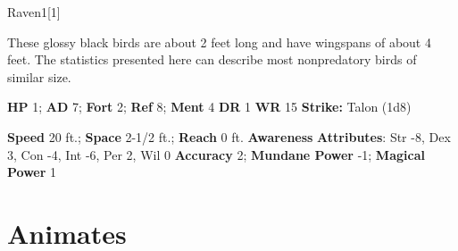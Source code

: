   
  \begin{monsection}{Raven}{1}[1]
    \vspace{-1em}\vspace{-1em}
    \vspace{0em}

    
      These glossy black birds are about 2 feet long and have wingspans of about 4 feet.
      The statistics presented here can describe most nonpredatory birds of similar size.
    

    \begin{spellcontent}
      \begin{spelltargetinginfo}
        \pari \textbf{HP} 1;
          \textbf{AD} 7;
          \textbf{Fort} 2;
          \textbf{Ref} 8;
          \textbf{Ment} 4
        \pari \textbf{DR} 1
        \pari \textbf{WR} 15
        \pari \textbf{Strike:}
            Talon  (1d8)
      \end{spelltargetinginfo}
    \end{spellcontent}
    \begin{monsterfooter}
      \pari \textbf{Speed} 20 ft.;
        \textbf{Space} 2-1/2 ft.;
        \textbf{Reach} 0 ft.
      \pari \textbf{Awareness} 
      \pari \textbf{Attributes}:
        Str -8, Dex 3,
        Con -4, Int -6,
        Per 2, Wil 0
      \pari \textbf{Accuracy} 2;
        \textbf{Mundane Power} -1;
      \textbf{Magical Power} 1
    \end{monsterfooter}
  \end{monsection}
  
  
        \section{Animates}
      

